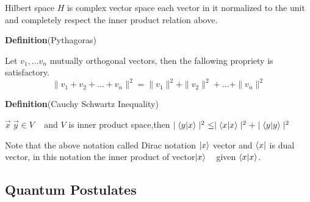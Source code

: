 Hilbert space $H$ is complex vector space  each vector in it normalized to the unit and completely  respect the inner product relation above\citep{book:4365}.

\textbf{Definition}{(Pythagoras)}

Let $v_1,\dots v_n$ mutually orthogonal vectors, then the fallowing propriety  is satisfactory.
$$\parallel v_1+v_2+\dots+v_n\parallel^2=\parallel v_1\parallel^2+\parallel v_2\parallel^2+\dots +\parallel v_n\parallel^2$$


\textbf{Definition}{(Cauchy Schwartz Inequality)}

$\vec{x} ~\vec{y} \in V $ ~ and $V$ is inner product space,then $\mid \bra{y} \ket{x} \mid^2~\leq \mid \bra{x} \ket{x} \mid^2+\mid \bra{y} \ket{y} \mid^2$


Note that the above notation called Dirac notation $\ket{x}$ vector and $\bra{x}$ is dual vector, in this notation the inner product of vector$\ket{x}$ ~ given $\bra{x}\ket{x}$.
\subsection{Quantum Postulates}


